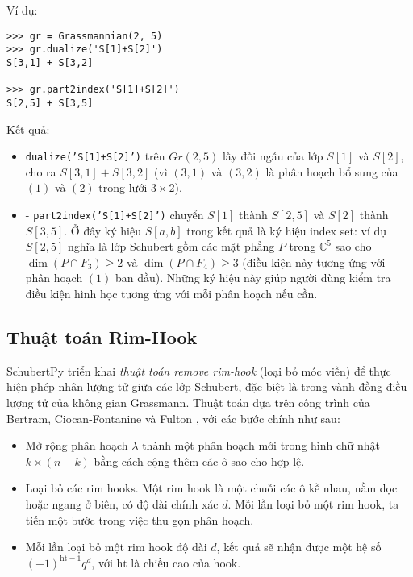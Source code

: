 Ví dụ:
\small
\begin{verbatim}
>>> gr = Grassmannian(2, 5)
>>> gr.dualize('S[1]+S[2]')
S[3,1] + S[3,2]

>>> gr.part2index('S[1]+S[2]')
S[2,5] + S[3,5]
\end{verbatim}
\normalsize

Kết quả:
\begin{itemize}
    \item \texttt{dualize('S[1]+S[2]')} trên $Gr(2,5)$ lấy đối ngẫu của lớp $S[1]$ và $S[2]$, cho ra $S[3,1] + S[3,2]$ (vì $(3,1)$ và $(3,2)$ là phân hoạch bổ sung của $(1)$ và $(2)$ trong lưới $3\times 2$).
    \item - \texttt{part2index('S[1]+S[2]')} chuyển $S[1]$ thành $S[2,5]$ và $S[2]$ thành $S[3,5]$. Ở đây ký hiệu $S[a,b]$ trong kết quả là ký hiệu index set: ví dụ $S[2,5]$ nghĩa là lớp Schubert gồm các mặt phẳng $P$ trong $\mathbb{C}^5$ sao cho $\dim(P \cap F_3) \ge 2$ và $\dim(P \cap F_4) \ge 3$ (điều kiện này tương ứng với phân hoạch $(1)$ ban đầu). Những ký hiệu này giúp người dùng kiểm tra điều kiện hình học tương ứng với mỗi phân hoạch nếu cần.
\end{itemize}


\subsection{Thuật toán Rim-Hook}

SchubertPy triển khai \textit{thuật toán remove rim-hook} (loại bỏ móc viền) để thực hiện phép nhân lượng tử giữa các lớp Schubert, đặc biệt là trong vành đồng điều lượng tử của không gian Grassmann. Thuật toán dựa trên công trình của Bertram, Ciocan-Fontanine và Fulton \cite{bertram1999quantum}, với các bước chính như sau:

\begin{itemize}
    \item Mở rộng phân hoạch $\lambda$ thành một phân hoạch mới trong hình chữ nhật $k \times (n-k)$ bằng cách cộng thêm các ô sao cho hợp lệ.    
    \item Loại bỏ các rim hooks. Một rim hook là một chuỗi các ô kề nhau, nằm dọc hoặc ngang ở biên, có độ dài chính xác $d$. Mỗi lần loại bỏ một rim hook, ta tiến một bước trong việc thu gọn phân hoạch.
    \item Mỗi lần loại bỏ một rim hook độ dài $d$, kết quả sẽ nhận được một hệ số $(-1)^{\mathrm{ht} - 1} q^d$, với $\mathrm{ht}$ là chiều cao của hook.
\end{itemize}


